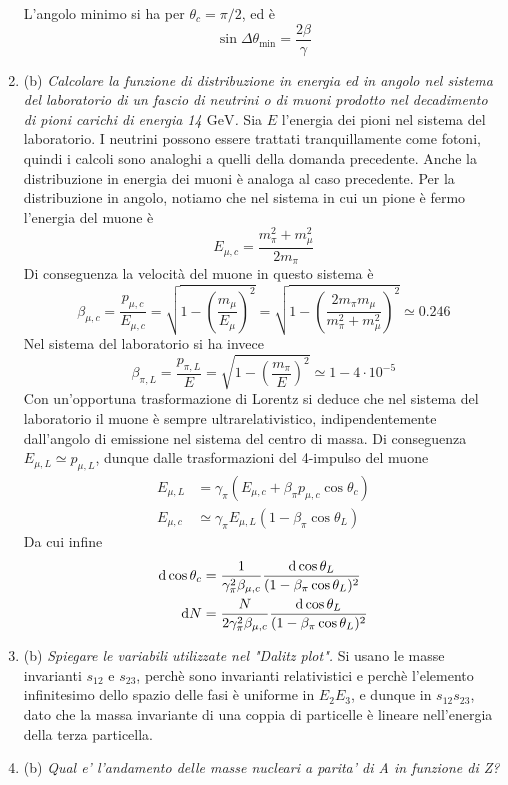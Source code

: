 \documentclass{article}
\renewcommand{\b}{(b)}
\renewcommand{\t}[1]{\textit{ #1}}
\begin{document}
\begin{enumerate}
L'angolo minimo si ha per $\theta_c=\pi/2$, ed è
\[\sin\Delta\theta_\textrm{min}=\frac{2\beta}{\gamma}\]
\item\b\t{Calcolare la funzione di distribuzione in energia ed in angolo nel sistema del
	laboratorio di un fascio di neutrini o di muoni prodotto nel decadimento di pioni
	carichi di energia 14 $\mathrm{GeV}$.}
Sia $E$ l'energia dei pioni nel sistema del laboratorio. I neutrini possono essere trattati tranquillamente come fotoni, quindi i calcoli sono analoghi a quelli della domanda precedente. Anche la distribuzione in energia dei muoni è analoga al caso precedente. Per la distribuzione in angolo, notiamo che nel sistema in cui un pione è fermo l'energia del muone è
\[E_{\mu,c}=\frac{m_\pi^2+m_\mu^2}{2m_\pi}\]
Di conseguenza la velocità del muone in questo sistema è
\[\beta_{\mu,c}=\frac{p_{\mu,c}}{E_{\mu,c}}=\sqrt{1-\left(\frac{m_\mu}{E_\mu}\right)^2}=\sqrt{1-\left(\frac{2m_\pi m_\mu}{m_\pi^2+m_\mu^2}\right)^2}\simeq0.246\]
Nel sistema del laboratorio si ha invece
\[\beta_{\pi,L}=\frac{p_{\pi,L}}{E}=\sqrt{1-\left(\frac{m_\pi}{E}\right)^2}\simeq1-4\cdot10^{-5}\]
Con un'opportuna trasformazione di Lorentz si deduce che nel sistema del laboratorio il muone è sempre ultrarelativistico, indipendentemente dall'angolo di emissione nel sistema del centro di massa. Di conseguenza $E_{\mu,L}\simeq p_{\mu,L}$, dunque dalle trasformazioni del 4-impulso del muone
\begin{align*}
	E_{\mu,L}&=\gamma_\pi\left(E_{\mu,c}+\beta_\pi p_{\mu,c}\cos\theta_c\right)\\E_{\mu,c}&\simeq\gamma_\pi E_{\mu,L}(1-\beta_\pi\cos\theta_L)
\end{align*}
Da cui infine
\begin{align*}
	\mathrm{d} \cos\theta_c&=\frac{1}{\gamma_\pi^2\beta_{\mu,c}}\frac{\mathrm{d} \cos\theta_L}{(1-\beta_\pi \cos\theta_L)^2}\\ \mathrm{d} N&=\frac{N}{2\gamma_\pi^2\beta_{\mu,c}}\frac{\mathrm{d} \cos\theta_L}{(1-\beta_\pi \cos\theta_L)^2}
\end{align*}
\item\b\t{Spiegare le variabili utilizzate nel "Dalitz plot".} Si usano le masse invarianti $s_{12}$ e $s_{23}$, perchè sono invarianti relativistici e perchè l'elemento infinitesimo dello spazio delle fasi è uniforme in $E_2E_3$, e dunque in $s_{12}s_{23}$, dato che la massa invariante di una coppia di particelle è lineare nell'energia della terza particella.
\item\b\t{Qual e' l'andamento delle masse nucleari a parita' di A in funzione di Z?}

\end{enumerate}
\end{document}

